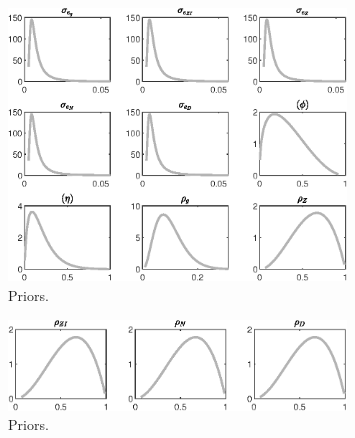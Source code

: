  
\begin{figure}[H]
\centering
\includegraphics[width=0.80\textwidth]{BRS_growth_id/graphs/BRS_growth_id_Priors1}
\caption{Priors.}\label{Fig:Priors:1}
\end{figure}
\begin{figure}[H]
\centering
\includegraphics[width=0.80\textwidth]{BRS_growth_id/graphs/BRS_growth_id_Priors2}
\caption{Priors.}\label{Fig:Priors:2}
\end{figure}
 
